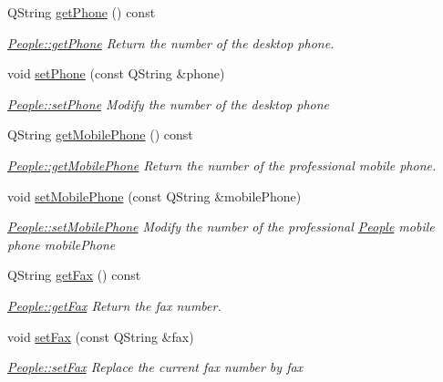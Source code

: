 \begin{DoxyCompactItemize}
Q\-String \hyperlink{classModels_1_1People_a4e30c7e027f2be5c8bc7813e37e12f94}{get\-Phone} () const 
\begin{DoxyCompactList}\small\item\em \hyperlink{classModels_1_1People_a4e30c7e027f2be5c8bc7813e37e12f94}{People\-::get\-Phone} Return the number of the desktop phone. \end{DoxyCompactList}\item 
void \hyperlink{classModels_1_1People_adea0f24c3438d7c65a6df522e3253863}{set\-Phone} (const Q\-String \&phone)
\begin{DoxyCompactList}\small\item\em \hyperlink{classModels_1_1People_adea0f24c3438d7c65a6df522e3253863}{People\-::set\-Phone} Modify the number of the desktop {\itshape phone} \end{DoxyCompactList}\item 
Q\-String \hyperlink{classModels_1_1People_aaf8d6ac89ea0ae0a1064503f3b9b6dbb}{get\-Mobile\-Phone} () const 
\begin{DoxyCompactList}\small\item\em \hyperlink{classModels_1_1People_aaf8d6ac89ea0ae0a1064503f3b9b6dbb}{People\-::get\-Mobile\-Phone} Return the number of the professional mobile phone. \end{DoxyCompactList}\item 
void \hyperlink{classModels_1_1People_a38e71d8991c2ef70f4f3f4b864913a58}{set\-Mobile\-Phone} (const Q\-String \&mobile\-Phone)
\begin{DoxyCompactList}\small\item\em \hyperlink{classModels_1_1People_a38e71d8991c2ef70f4f3f4b864913a58}{People\-::set\-Mobile\-Phone} Modify the number of the professional \hyperlink{classModels_1_1People}{People} mobile phone {\itshape mobile\-Phone} \end{DoxyCompactList}\item 
Q\-String \hyperlink{classModels_1_1People_a30b8378d221c9f20a66797a526973be9}{get\-Fax} () const 
\begin{DoxyCompactList}\small\item\em \hyperlink{classModels_1_1People_a30b8378d221c9f20a66797a526973be9}{People\-::get\-Fax} Return the fax number. \end{DoxyCompactList}\item 
void \hyperlink{classModels_1_1People_adaa1a83318fd0a251cbcc4a93dc01096}{set\-Fax} (const Q\-String \&fax)
\begin{DoxyCompactList}\small\item\em \hyperlink{classModels_1_1People_adaa1a83318fd0a251cbcc4a93dc01096}{People\-::set\-Fax} Replace the current fax number by {\itshape fax} \end{DoxyCompactList}\item 

\end{DoxyCompactItemize}
